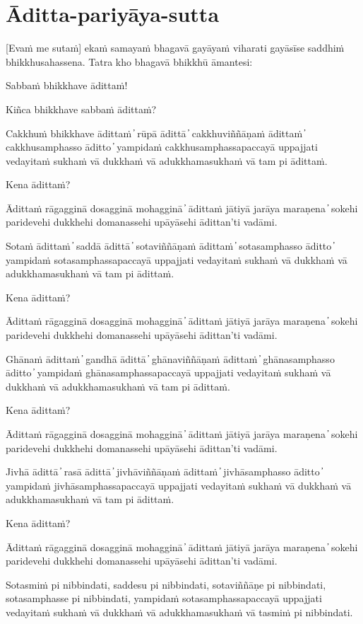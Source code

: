 \section{Āditta-pariyāya-sutta}

[Evaṁ me sutaṁ] ekaṁ samayaṁ bhagavā gayāyaṁ viharati gayāsīse saddhiṁ bhikkhusahassena. Tatra kho bhagavā bhikkhū āmantesi:

Sabbaṁ bhikkhave ādittaṁ!

Kiñca bhikkhave sabbaṁ ādittaṁ?

Cakkhuṁ bhikkhave ādittaṁ  ̓  rūpā ādittā  ̓  cakkhuviññāṇaṁ ādittaṁ  ̓  cakkhusamphasso āditto  ̓  yampidaṁ cakkhusamphassapaccayā uppajjati vedayitaṁ sukhaṁ vā dukkhaṁ vā adukkhamasukhaṁ vā tam pi ādittaṁ.

Kena ādittaṁ?

Ādittaṁ rāgagginā dosagginā mohagginā  ̓  ādittaṁ jātiyā jarāya maraṇena  ̓  sokehi paridevehi dukkhehi domanassehi upāyāsehi ādittan’ti vadāmi.

Sotaṁ ādittaṁ  ̓  saddā ādittā  ̓  sotaviññāṇaṁ ādittaṁ  ̓  sotasamphasso āditto  ̓  yampidaṁ sotasamphassapaccayā uppajjati vedayitaṁ sukhaṁ vā dukkhaṁ vā adukkhamasukhaṁ vā tam pi ādittaṁ.

Kena ādittaṁ?

Ādittaṁ rāgagginā dosagginā mohagginā  ̓  ādittaṁ jātiyā jarāya maraṇena  ̓  sokehi paridevehi dukkhehi domanassehi upāyāsehi ādittan’ti vadāmi.

Ghānaṁ ādittaṁ  ̓  gandhā ādittā  ̓  ghānaviññāṇaṁ ādittaṁ  ̓  ghānasamphasso āditto  ̓  yampidaṁ ghānasamphassapaccayā uppajjati vedayitaṁ sukhaṁ vā dukkhaṁ vā adukkhamasukhaṁ vā tam pi ādittaṁ.

Kena ādittaṁ?

Ādittaṁ rāgagginā dosagginā mohagginā  ̓  ādittaṁ jātiyā jarāya maraṇena  ̓  sokehi paridevehi dukkhehi domanassehi upāyāsehi ādittan’ti vadāmi.

Jivhā ādittā  ̓  rasā ādittā  ̓  jivhāviññāṇaṁ ādittaṁ  ̓  jivhāsamphasso āditto  ̓  yampidaṁ jivhāsamphassapaccayā uppajjati vedayitaṁ sukhaṁ vā dukkhaṁ vā adukkhamasukhaṁ vā tam pi ādittaṁ.

Kena ādittaṁ?

Ādittaṁ rāgagginā dosagginā mohagginā  ̓  ādittaṁ jātiyā jarāya maraṇena  ̓  sokehi paridevehi dukkhehi domanassehi upāyāsehi ādittan’ti vadāmi.

Sotasmiṁ pi nibbindati, saddesu pi nibbindati, sotaviññāṇe pi
nibbindati, sotasamphasse pi nibbindati, yampidaṁ sotasamphassapaccayā
uppajjati vedayitaṁ sukhaṁ vā dukkhaṁ vā adukkhamasukhaṁ vā tasmiṁ pi
nibbindati.

